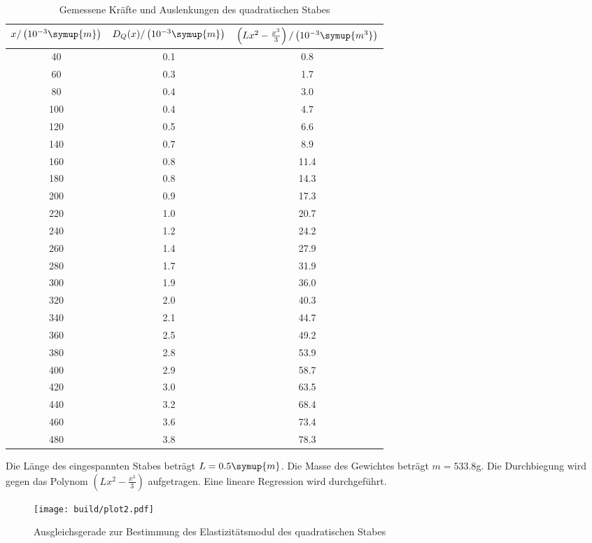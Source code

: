 \begin{table}[H]
  \centering
  \caption{Gemessene Kräfte und Auslenkungen des quadratischen Stabes}
  \label{tab:quadratischer Stab}
  \begin{tabular}{c c c}
    \toprule
    $x/\left(10^{-3}\symup{m}\right)$ & $D_Q(x)/\left(10^{-3}\symup{m}\right)$ & $\left(Lx^2 -\frac{x^3}{3}\right)/\left(10^{-3}\symup{m^3}\right)$\\
    \midrule
     40 & 0.1 &  0.8 \\
     60 & 0.3 &  1.7 \\
     80 & 0.4 &  3.0 \\
    100 & 0.4 &  4.7 \\
    120 & 0.5 &  6.6 \\
    140 & 0.7 &  8.9 \\
    160 & 0.8 & 11.4 \\
    180 & 0.8 & 14.3 \\
    200 & 0.9 & 17.3 \\
    220 & 1.0 & 20.7 \\
    240 & 1.2 & 24.2 \\
    260 & 1.4 & 27.9 \\
    280 & 1.7 & 31.9 \\
    300 & 1.9 & 36.0 \\
    320 & 2.0 & 40.3 \\
    340 & 2.1 & 44.7 \\
    360 & 2.5 & 49.2 \\
    380 & 2.8 & 53.9 \\
    400 & 2.9 & 58.7 \\
    420 & 3.0 & 63.5 \\
    440 & 3.2 & 68.4 \\
    460 & 3.6 & 73.4 \\
    480 & 3.8 & 78.3 \\
    \bottomrule
  \end{tabular}
\end{table}

Die Länge des eingespannten Stabes beträgt $L = 0.5 \symup{m}$. Die Masse des
Gewichtes beträgt $m = 533.8$g.
Die Durchbiegung wird gegen das Polynom $\left(Lx^2 -\frac{x^3}{3}\right)$ aufgetragen. Eine
lineare Regression wird durchgeführt.

\begin{figure}[H]
  \centering
  \texttt{[image: build/plot2.pdf]}
  \caption{Ausgleichsgerade zur Bestimmung des Elastizitätsmodul des quadratischen Stabes}
  \label{fig:Elastizitätsmodul des quadratischen Stabes}
\end{figure}

